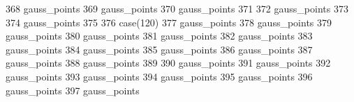 \begin{DoxyCode}
{{{{{{{{{{{{{{{{{{{{{{{{{{{{{{{{{{368               gauss_points%
369               gauss_points%
370               gauss_points%
371               
372               gauss_points%
373 
374               gauss_points%
375 
376               \textcolor{keywordflow}{case}(120)
377                 gauss_points%
378 \textcolor{comment}{                gauss_points%
379 \textcolor{comment}{                gauss_points%
380 \textcolor{comment}{                gauss_points%
381 \textcolor{comment}{                gauss_points%
382 \textcolor{comment}{                gauss_points%
383 \textcolor{comment}{                gauss_points%
384 \textcolor{comment}{                gauss_points%
385 \textcolor{comment}{                gauss_points%
386 \textcolor{comment}{                gauss_points%
387 \textcolor{comment}{                gauss_points%
388 \textcolor{comment}{                gauss_points%
389 \textcolor{comment}{}
390 \textcolor{comment}{                gauss_points%
391 \textcolor{comment}{                gauss_points%
392 \textcolor{comment}{                gauss_points%
393 \textcolor{comment}{                gauss_points%
394 \textcolor{comment}{                gauss_points%
395 \textcolor{comment}{                gauss_points%
396 \textcolor{comment}{                gauss_points%
397 \textcolor{comment}{                gauss_points%
}}}}}}}}}}}}}}}}}}}}}}}}}}}}}}}}}}}}}}}}}}}}}}}}}}}}}
\end{DoxyCode}

